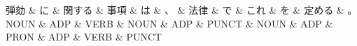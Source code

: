 \documentclass[tikz,border=5pt]{standalone}
\begin{document}
\normalsize
\begin{dependency}[edge unit distance=12.0pt]
    \begin{deptext}[column sep=1em]
        弾劾 \& に \& 関する \& 事項 \& は \& 、 \& 法律 \& で \& これ \& を \& 定める \& 。\\
        NOUN \& ADP \& VERB \& NOUN \& ADP \& PUNCT \& NOUN \& ADP \& PRON \& ADP \& VERB \& PUNCT\\
    \end{deptext}
\end{dependency}
\end{document}
